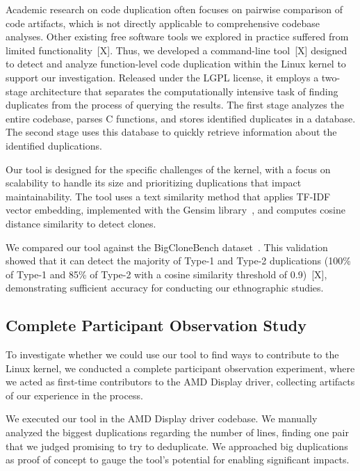 \documentclass[10pt,conference]{IEEEtran}
\begin{document}
Academic research on code duplication often focuses on pairwise comparison of code artifacts, which is not directly applicable to comprehensive codebase analyses. Other existing free software tools we explored in practice suffered from limited functionality~[X]. Thus, we developed a command-line tool~[X] designed to detect and analyze function-level code duplication within the Linux kernel to support our investigation. Released under the LGPL license, it employs a two-stage architecture that separates the computationally intensive task of finding duplicates from the process of querying the results. The first stage analyzes the entire codebase, parses C functions, and stores identified duplicates in a database. The second stage uses this database to quickly retrieve information about the identified duplications.

Our tool is designed for the specific challenges of the kernel, with a focus on scalability to handle its size and prioritizing duplications that impact maintainability. The tool uses a text similarity method that applies TF-IDF vector embedding, implemented with the Gensim library~\cite{gensim}, and computes cosine distance similarity to detect clones. 

We compared our tool against the BigCloneBench dataset~\cite{bigclonebench}. This validation showed that it can detect the majority of Type-1 and Type-2 duplications (100\% of Type-1 and 85\% of Type-2 with a cosine similarity threshold of 0.9)~[X], demonstrating sufficient accuracy for conducting our ethnographic studies.

\subsection{Complete Participant Observation Study}
\label{sec:participant}

To investigate whether we could use our tool to find ways to contribute to the Linux kernel, we conducted a complete participant observation experiment, where we acted as first-time contributors to the AMD Display driver, collecting artifacts of our experience in the process.

We executed our tool in the AMD Display driver codebase. We manually analyzed the biggest duplications regarding the number of lines, finding one pair that we judged promising to try to deduplicate. We approached big duplications as proof of concept to gauge the tool's potential for enabling significant impacts.
\end{document}
